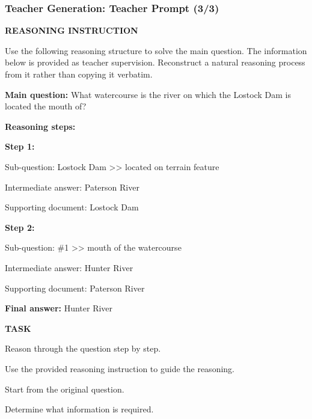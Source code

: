\begin{frame}[t]
    \frametitle{Teacher Generation: Teacher Prompt (3/3)}

    \scriptsize

    \textbf{REASONING INSTRUCTION}

    \vspace{0.04cm}

    Use the following reasoning structure to solve the main question.
    The information below is provided as teacher supervision.
    Reconstruct a natural reasoning process from it rather than
    copying it verbatim.

    \vspace{0.06cm}

    \textbf{Main question:} What watercourse is the river on which the
    Lostock Dam is located the mouth of?

    \vspace{0.05cm}

    \textbf{Reasoning steps:}

    \textbf{Step 1:}

    Sub-question: Lostock Dam >> located on terrain feature

    Intermediate answer: Paterson River

    Supporting document: Lostock Dam

    \vspace{0.05cm}

    \textbf{Step 2:}

    Sub-question: \#1 >> mouth of the watercourse

    Intermediate answer: Hunter River

    Supporting document: Paterson River

    \vspace{0.05cm}

    \textbf{Final answer:} Hunter River

    \vspace{0.08cm}

    \textbf{TASK}

    \vspace{0.04cm}

    Reason through the question step by step.

    Use the provided reasoning instruction to guide the reasoning.

    Start from the original question.

    Determine what information is required.


\end{frame}
